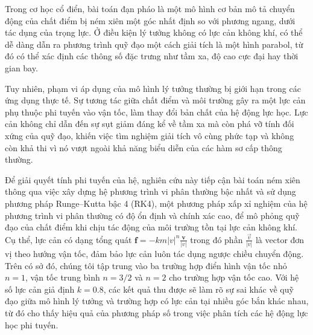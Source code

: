 Trong cơ học cổ điển, bài toán đạn pháo là một mô hình cơ bản mô tả chuyển động của chất điểm bị ném xiên một góc nhất định so với phương ngang, dưới tác dụng của trọng lực. Ở điều kiện lý tưởng không có lực cản không khí, có thể dễ dàng dẫn ra phương trình quỹ đạo một cách giải tích là một hình parabol, từ đó có thể xác định các thông số đặc trưng như tầm xa, độ cao cực đại hay thời gian bay.

Tuy nhiên, phạm vi áp dụng của mô hình lý tưởng thường bị giới hạn trong các ứng dụng thực tế. Sự tương tác giữa chất điểm và môi trường gây ra một lực cản phụ thuộc phi tuyến vào vận tốc, làm thay đổi bản chất của hệ động lực học. Lực cản không chỉ dẫn đến sự sụt giảm đáng kể về tầm xa mà còn phá vỡ tính đối xứng của quỹ đạo, khiến việc tìm nghiệm giải tích vô cùng phức tạp và không còn khả thi vì nó vượt ngoài khả năng biểu diễn của các hàm sơ cấp thông thường.

Để giải quyết tính phi tuyến của hệ, nghiên cứu này tiếp cận bài toán ném xiên thông qua việc xây dựng hệ phương trình vi phân thường bậc nhất và sử dụng phương pháp Runge--Kutta bậc 4 (RK4), một phương pháp xấp xỉ nghiệm của hệ phương trình vi phân thường có độ ổn định và chính xác cao, để mô phỏng quỹ đạo của chất điểm khi chịu tác động của môi trường tồn tại lực cản không khí. Cụ thể, lực cản có dạng tổng quát \(\mathbf{f} = -km |v|^n \frac{\mathbf{v}}{|v|}\) trong đó phần $\frac{\vec{v}}{|v|}$ là vector đơn vị theo hướng vận tốc, đảm bảo lực cản luôn tác dụng ngược chiều chuyển động. Trên có sở đó, chúng tôi tập trung vào ba trường hợp điển hình vận tốc nhỏ $n = 1$, vận tốc trung bình $n = 3/2$ và $n = 2$ cho trường hợp vận tốc cao. Với hệ số lực cản giả định $k = 0.8$, các kết quả thu được sẽ làm rõ sự sai khác về quỹ đạo giữa mô hình lý tưởng và trường hợp có lực cản tại nhiều góc bắn khác nhau, từ đó cho thấy hiệu quả của phương pháp số trong việc phân tích các hệ động lực học phi tuyến.
